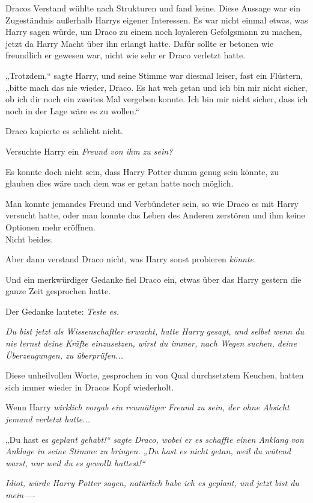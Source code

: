 {Dracos Verstand wühlte nach Strukturen und fand keine. Diese Aussage war ein Zugeständnis außerhalb Harrys eigener Interessen. Es war nicht einmal etwas, was Harry sagen würde, um Draco zu einem noch loyaleren Gefolgsmann zu machen, jetzt da Harry Macht über ihn erlangt hatte. Dafür sollte er betonen wie freundlich er gewesen war, nicht wie sehr er Draco verletzt hatte.

„Trotzdem,“ sagte Harry, und seine Stimme war diesmal leiser, fast ein Flüstern, „bitte mach das nie wieder, Draco. Es hat weh getan und ich bin mir nicht sicher, ob ich dir noch ein zweites Mal vergeben konnte. Ich bin mir nicht sicher, dass ich noch in der Lage wäre es zu wollen.“

Draco kapierte es schlicht nicht.

Versuchte Harry ein \emph{Freund von ihm zu sein?}

Es konnte doch nicht sein, dass Harry Potter dumm genug sein könnte, zu glauben dies wäre nach dem was er getan hatte noch möglich.

Man konnte jemandes Freund und Verbündeter sein, so wie Draco es mit Harry versucht hatte, oder man konnte das Leben des Anderen zerstören und ihm keine Optionen mehr eröffnen.\\ Nicht beides.

Aber dann verstand Draco nicht, was Harry sonst probieren \emph{könnte.}

Und ein merkwürdiger Gedanke fiel Draco ein, etwas über das Harry gestern die ganze Zeit gesprochen hatte.

Der Gedanke lautete: \emph{Teste es.}

\emph{Du bist jetzt als Wissenschaftler erwacht, hatte Harry gesagt, \emph{und selbst wenn du nie lernst deine Kräfte einzusetzen, wirst du immer, nach Wegen suchen, deine Überzeugungen, zu überprüfen...}}

Diese unheilvollen Worte, gesprochen in von Qual durchsetztem Keuchen, hatten sich immer wieder in Dracos Kopf wiederholt.

Wenn Harry \emph{wirklich vorgab ein reumütiger Freund zu sein, der ohne Absicht jemand verletzt hatte...}

„Du hast es \emph{geplant gehabt!“ sagte Draco, wobei er es schaffte einen Anklang von Anklage in seine Stimme zu bringen. „Du hast es nicht getan, weil du wütend warst, nur weil du es \emph{gewollt} hattest!“}

\emph{Idiot, würde Harry Potter sagen, natürlich habe ich es geplant, und jetzt bist du mein----}

}

